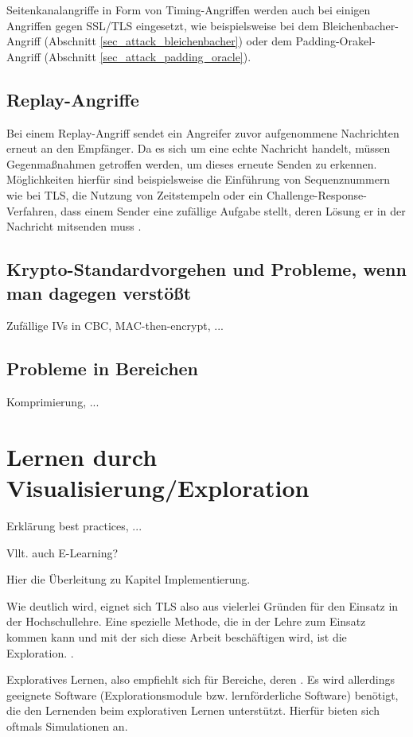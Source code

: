 Seitenkanalangriffe in Form von Timing-Angriffen werden auch bei einigen Angriffen gegen SSL/TLS eingesetzt, wie beispielsweise bei dem Bleichenbacher-Angriff (Abschnitt \ref{sec_attack_bleichenbacher}) oder dem Padding-Orakel-Angriff (Abschnitt \ref{sec_attack_padding_oracle}).

\subsection{Replay-Angriffe}

Bei einem Replay-Angriff sendet ein Angreifer zuvor aufgenommene Nachrichten erneut an den Empfänger. Da es sich um eine echte Nachricht handelt, müssen Gegenmaßnahmen getroffen werden, um dieses erneute Senden zu erkennen. Möglichkeiten hierfür sind beispielsweise die Einführung von Sequenznummern wie bei TLS, die Nutzung von Zeitstempeln oder ein Challenge-Response-Verfahren, dass einem Sender eine zufällige Aufgabe stellt, deren Lösung er in der Nachricht mitsenden muss \cite{ferguson10}.

\subsection{Krypto-Standardvorgehen und Probleme, wenn man dagegen verstößt}
Zufällige IVs in CBC, MAC-then-encrypt, ...

\subsection{Probleme in  Bereichen}
Komprimierung, ...

\section{Lernen durch Visualisierung/Exploration}

\begin{mdframed}
Erklärung best practices, ...

Vllt. auch E-Learning?

Hier die Überleitung zu Kapitel Implementierung. 
\end{mdframed}

Wie deutlich wird, eignet sich TLS also aus vielerlei Gründen für den Einsatz in der Hochschullehre. Eine spezielle Methode, die in der Lehre zum Einsatz kommen kann und mit der sich diese Arbeit beschäftigen wird, ist die Exploration. .

Exploratives Lernen, also  empfiehlt sich für Bereiche, deren  \cite{schubert11}. 
Es wird allerdings geeignete Software (Explorationsmodule bzw. lernförderliche Software) benötigt, die den Lernenden beim explorativen Lernen unterstützt. Hierfür bieten sich oftmals Simulationen an. 

